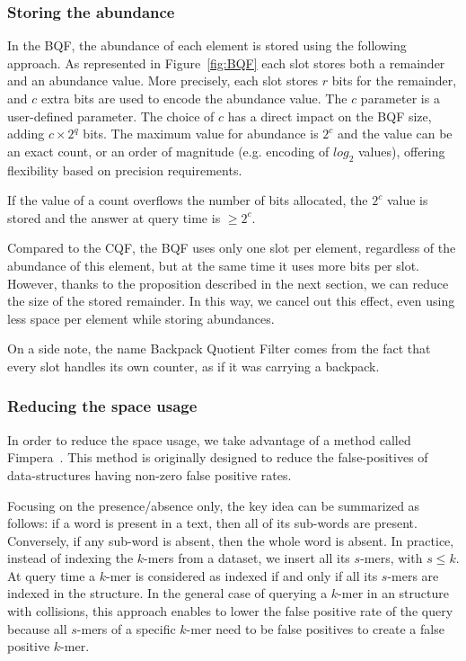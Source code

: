 \subsubsection{Storing the abundance}
In the BQF, the abundance of each element is stored using the following approach. 
As represented in Figure~\ref{fig:BQF} each slot stores both a remainder and an abundance value. More precisely, each slot stores $r$ bits for the remainder, and $c$ extra bits are used to encode the abundance value. 
The $c$ parameter is a user-defined parameter. The choice of $c$ has a direct impact on the BQF size, adding $c\times 2^q$ bits. The maximum value for abundance is $2^c$ and the value can be an exact count, or an order of magnitude (e.g. encoding of $log_2$ values), offering flexibility based on precision requirements.

If the value of a count overflows the number of bits allocated, the $2^c$ value is stored and the answer at query time is $\ge 2^c$.

Compared to the CQF, the BQF uses only one slot per element, regardless of the abundance of this element, but at the same time it uses more bits per slot. However, thanks to the proposition described in the next section, we can reduce the size of the stored remainder. In this way, we cancel out this effect, even using less space per element while storing abundances.

On a side note, the name Backpack Quotient Filter comes from the fact that every slot handles its own counter, as if it was carrying a backpack.

\subsubsection{Reducing the space usage} \label{ssec:fimpera}

In order to reduce the space usage, we take advantage of a method called Fimpera~\cite{fimpera_2023}. This method is originally
designed to reduce the false-positives of data-structures having non-zero false positive rates. 

Focusing on the presence/absence only, the key idea can be summarized as follows: if a word is present in a text, then all of its sub-words are present. Conversely, if any sub-word is absent, then the whole word is absent. In practice, instead of indexing the $k$-mers from a dataset, we insert all its $s$-mers, with $s\leq k$. At query time a $k$-mer is considered as indexed if and only if all its $s$-mers are indexed in the structure. In the general case of querying a $k$-mer in an structure with collisions, this approach enables to lower the false positive rate of the query because all $s$-mers of a specific $k$-mer need to be false positives to create a false positive $k$-mer. 

